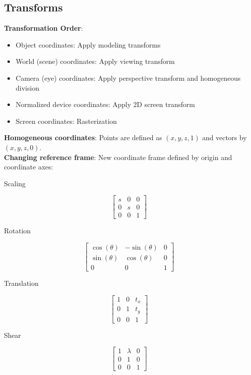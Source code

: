 \documentclass[9pt,landscape]{extarticle}
\begin{document}
\begin{multicols}{3}

\section{Transforms}

\textbf{Transformation Order}:
\begin{itemize}[nosep]
    \item Object coordinates: Apply modeling transforms
    \item World (scene) coordinates: Apply viewing transform
    \item Camera (eye) coordinates: Apply perspective transform and homogeneous division
    \item Normalized device coordinates: Apply 2D screen transform
    \item Screen coordinates: Rasterization
\end{itemize}

\textbf{Homogeneous coordinates}: Points are defined as $(x, y, z, 1)$ and vectors by $(x, y, z, 0)$. \\

\textbf{Changing reference frame}: New coordinate frame defined by origin and coordinate axes:

\begin{multicols}{2}

Scaling

$$
\begin{bmatrix}
s & 0 & 0 \\
0 & s & 0 \\
0 & 0 & 1
\end{bmatrix}
$$

Rotation

$$
\begin{bmatrix}
\cos(\theta) & -\sin(\theta) & 0 \\
\sin(\theta) & \cos(\theta) & 0 \\
0 & 0 & 1
\end{bmatrix}
$$

\columnbreak

Translation

$$\begin{bmatrix}
1 & 0 & t_x \\
0 & 1 & t_y \\
0 & 0 & 1
\end{bmatrix}$$

Shear

$$
\begin{bmatrix}
1 & \lambda & 0 \\
0 & 1 & 0 \\
0 & 0 & 1
\end{bmatrix}
$$


\end{multicols}
\end{multicols}
\end{document}
